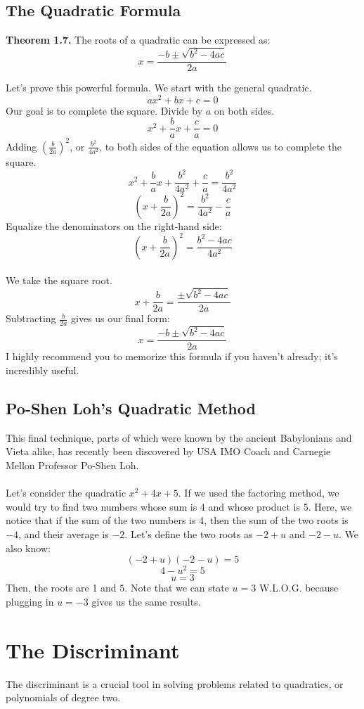 \documentclass{article}
\begin{document}
\subsection{The Quadratic Formula}
\begin{mdframed}
  \textbf{Theorem 1.7.} The roots of a quadratic can be expressed as: $$x=\frac{-b\pm\sqrt{b^2-4ac}}{2a}$$
\end{mdframed}
Let's prove this powerful formula. We start with the general quadratic. $$ax^2+bx+c=0$$
Our goal is to complete the square. Divide by $a$ on both sides.
$$x^2+\frac{b}{a}x+\frac{c}{a}=0$$
Adding $(\frac{b}{2a})^2$, or $\frac{b^2}{4a^2}$, to both sides of the equation allows us to complete the square.
$$x^2+\frac{b}{a}x+\frac{b^2}{4a^2}+\frac{c}{a}=\frac{b^2}{4a^2}$$
$$(x+\frac{b}{2a})^2=\frac{b^2}{4a^2}-\frac{c}{a}$$
Equalize the denominators on the right-hand side:
$$(x+\frac{b}{2a})^2=\frac{b^2-4ac}{4a^2}$$\\
We take the square root.
$$x+\frac{b}{2a}=\frac{\pm\sqrt{b^2-4ac}}{2a}$$
Subtracting $\frac{b}{2a}$ gives us our final form:
$$x=\frac{-b\pm\sqrt{b^2-4ac}}{2a}$$
I highly recommend you to memorize this formula if you haven't already; it's incredibly useful.

\subsection{Po-Shen Loh's Quadratic Method}
This final technique, parts of which were known by the ancient Babylonians and Vieta alike, has recently been discovered by USA IMO Coach and Carnegie Mellon Professor Po-Shen Loh.
\\\\Let's consider the quadratic $x^2+4x+5$. If we used the factoring method, we would try to find two numbers whose sum is 4 and whose product is 5. Here, we notice that if the sum of the two numbers is 4, then the sum of the two roots is $-4$, and their average is $-2$. Let's define the two roots as $-2+u$ and $-2-u$. We also know:
$$(-2+u)(-2-u)=5$$
$$4-u^2=5$$
$$u=3$$
Then, the roots are 1 and $5$. Note that we can state $u=3$ W.L.O.G. because plugging in $u=-3$ gives us the same results.


\section{The Discriminant}
The discriminant is a crucial tool in solving problems related to quadratics, or polynomials of degree two.\\
\end{document}
